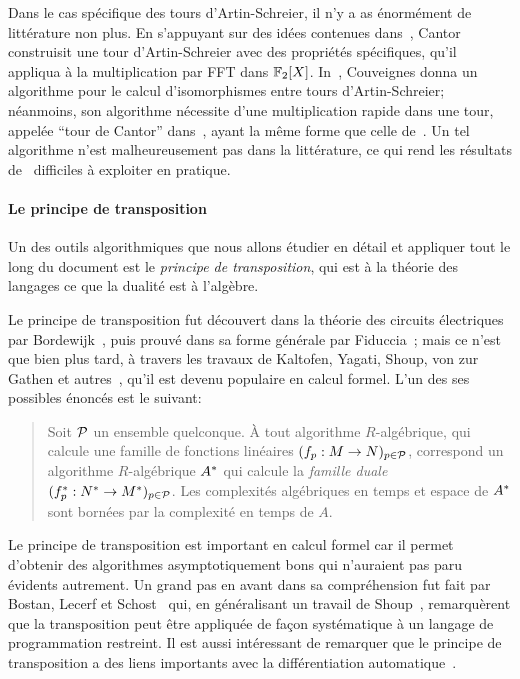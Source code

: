 Dans le cas spécifique des tours d'Artin-Schreier, il n'y a as
énormément de littérature non plus. En s'appuyant sur des idées
contenues dans~\cite{Conway:ONAG2000}, Cantor~\cite{cantor89}
construisit une tour d'Artin-Schreier avec des propriétés spécifiques,
qu'il appliqua à la multiplication par FFT dans
$\mathbb{F}_2[X]$. In~\cite{couveignes00}, Couveignes donna un algorithme pour
le calcul d'isomorphismes entre tours d'Artin-Schreier; néanmoins, son
algorithme nécessite d'une multiplication rapide dans une tour,
appelée ``tour de Cantor'' dans~\cite{couveignes00}, ayant la même
forme que celle de~\cite{cantor89}. Un tel algorithme n'est
malheureusement pas dans la littérature, ce qui rend les résultats
de~\cite{couveignes00} difficiles à exploiter en pratique.

\paragraph*{Le principe de transposition}
Un des outils algorithmiques que nous allons étudier en détail et
appliquer tout le long du document est le \emph{principe de
  transposition}, qui est à la théorie des langages ce que la dualité
est à l'algèbre.

Le principe de transposition fut découvert dans la théorie des
circuits électri\-ques par Bordewijk~\cite{bordewijk57}, puis prouvé
dans sa forme générale par Fiduccia~\cite{fiduccia:phd}; mais ce n'est
que bien plus tard, à travers les travaux de Kaltofen, Yagati, Shoup,
von zur Gathen et
autres~\cite{kaltofen+lakshman89,vzgathen+shoup92,shoup94,shoup95,shoup99,hanrot+quercia+zimmermann},
qu'il est devenu populaire en calcul formel. L'un des ses possibles
énoncés est le suivant:
\begin{quote}
  Soit $\mathcal{P}$ un ensemble quelconque. À tout algorithme
  $R$-algébrique, qui calcule une famille de fonctions linéaires
  $(f_p:M\rightarrow N)_{p\in\mathcal{P}}$, correspond un algorithme
  $R$-algébrique $A^\ast$ qui calcule la \emph{famille duale}
  $(f^\ast_p:N^\ast\rightarrow M^\ast)_{p\in\mathcal{P}}$. Les complexités
  algébriques en temps et espace de $A^\ast$ sont bornées par la
  complexité en temps de $A$.
\end{quote}

Le principe de transposition est important en calcul formel car il
permet d'obtenir des algorithmes asymptotiquement bons qui n'auraient
pas paru évid\-ents autrement. Un grand pas en avant dans sa
compréhension fut fait par Bostan, Lecerf et
Schost~\cite{bostan+lecerf+schost:tellegen} qui, en généralisant un
travail de Shoup~\cite{shoup95}, remarquèrent que la transposition
peut être appliquée de façon systématique à un langage de
programmation restreint. Il est aussi intéressant de remarquer que le
principe de transposition a des liens importants avec la
différentiation
automatique~\cite{baur+strassen83,kaltofen+lakshman89,Ka2K,gashkov+gashkov05,sergeev08}.

